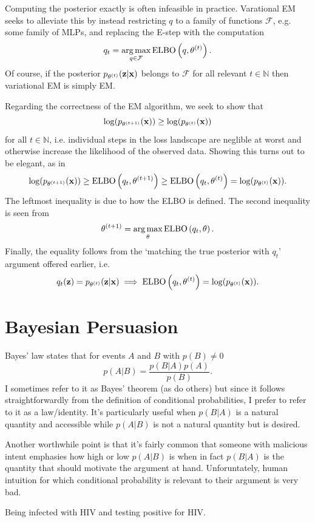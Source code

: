 \documentclass[11pt]{article}
\begin{document}
\begin{appendices}
\begin{tcolorbox}[title={\centering\textbf{Variational EM}}, colback=myLightBlue, colbacktitle=myDarkBlue, colframe=myDarkBlue, coltitle=white]
    Computing the posterior exactly is often infeasible in practice. Varational EM seeks to alleviate this by instead restricting $q$ to a family of functions $\mathcal{F}$, e.g. some family of MLPs, and replacing the E-step with the computation
    $$
    q_t
    =
    \operatorname*{arg\,max}_{q\in\mathcal{F}}\text{ELBO}\left(q,\theta^{(t)}\right).
    $$
    Of course, if the posterior $p_{\theta^{(t)}}(\mathbf{z}|\mathbf{x})$ belongs to $\mathcal{F}$ for all relevant $t\in\mathbb{N}$ then variational EM is simply EM.
\end{tcolorbox}
Regarding the correctness of the EM algorithm, we seek to show that
$$
\log(p_{\theta^{(t+1)}}(\mathbf{x}))
\geq
\log(p_{\theta^{(t)}}(\mathbf{x}))
$$
for all $t\in\mathbb{N}$, i.e. individual steps in the loss landscape are neglible at worst and otherwise increase the likelihood of the observed data. Showing this turns out to be elegant, as in
$$
\log(p_{\theta^{(t+1)}}(\mathbf{x}))
\geq
\text{ELBO}\left(q_t,\theta^{(t+1)}\right)
\geq
\text{ELBO}\left(q_t,\theta^{(t)}\right)
=
\log(p_{\theta^{(t)}}(\mathbf{x})).
$$
The leftmost inequality is due to how the ELBO is defined. The second inequality is seen from
$$
\theta^{(t+1)}
=
\operatorname*{arg\,max}_{\theta}\text{ELBO}\left(q_t,\theta\right).
$$
Finally, the equality follows from the `matching the true posterior with $q_t$' argument offered earlier, i.e.
$$
q_t(\mathbf{z})=p_{\theta^{(t)}}(\mathbf{z}|\mathbf{x})
\implies
\text{ELBO}\left(q_t,\theta^{(t)}\right)=\log(p_{\theta^{(t)}}(\mathbf{x})).
$$

\section{Bayesian Persuasion}
Bayes' law states that for events $A$ and $B$ with $p(B)\neq0$
$$
p(A|B)
=
\frac{p(B|A)p(A)}{p(B)}.
$$
I sometimes refer to it as Bayes' theorem (as do others) but since it follows straightforwardly from the definition of conditional probabilities, I prefer to refer to it as a law/identity. It's particularly useful when $p(B|A)$ is a natural quantity and accessible while $p(A|B)$ is not a natural quantity but is desired.

Another worthwhile point is that it's fairly common that someone with malicious intent emphasies how high or low $p(A|B)$ is when in fact $p(B|A)$ is the quantity that should motivate the argument at hand. Unforuntately, human intuition for which conditional probability is relevant to their argument is very bad.
\begin{example}
    Being infected with HIV and testing positive for HIV.
\end{example}


\end{appendices}
\end{document}
